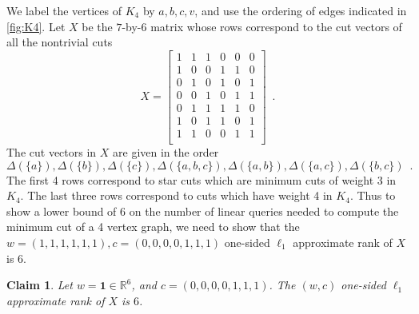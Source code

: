\documentclass[10pt,a4paper]{article}
\newcommand{\R}{\mathbb{R}}
\newcommand{\1}{\mathbf{1}}
\newtheorem{claim}[theorem]{Claim}
\theoremstyle{definition}
\begin{document}
We label the vertices of $K_4$ by $a,b,c,v$, and
use the ordering of edges indicated in \cref{fig:K4}.
Let $X$ be the $7$-by-$6$ matrix whose rows correspond to the cut vectors of all the nontrivial cuts
\begin{equation}
\label{eq:baseX}
X =
\begin{bmatrix}
1 &  1 &  1 &  0 &  0 &  0 \\
1 &  0 &  0 &  1 &  1 &  0 \\
0 &  1 &  0 &  1 &  0 &  1 \\
0 &  0 &  1 &  0 &  1 &  1 \\
0 &  1 &  1 &  1 &  1 &  0 \\
1 &  0 &  1 &  1 &  0 &  1 \\
1 &  1 &  0 &  0 &  1 &  1 \\
\end{bmatrix}
\enspace .
\end{equation}
The cut vectors in $X$ are given in the order
\[
\Delta(\{a\}), \Delta(\{b\}), \Delta(\{c\}), \Delta(\{a,b,c\}), \Delta(\{a,b\}), \Delta(\{a,c\}), \Delta(\{b,c\}) \enspace.
\]
The first 4 rows correspond to star cuts which are minimum cuts of weight 3 in $K_4$.  The last three rows correspond to cuts which have weight 4 in $K_4$.
Thus to show a lower bound of $6$ on the number of linear queries needed to compute the minimum
cut of a 4 vertex graph, we need to show that the $w=(1,1,1,1,1,1), c=(0,0,0,0,1,1,1)$ one-sided $\ell_1$ approximate rank of $X$ is 6.

\begin{claim}
Let $w = \1 \in \R^6$, and $c =(0,0,0,0,1,1,1)$.  The $(w,c)$ one-sided $\ell_1$ approximate
rank of $X$ is $6$.
\end{claim}
\end{document}
